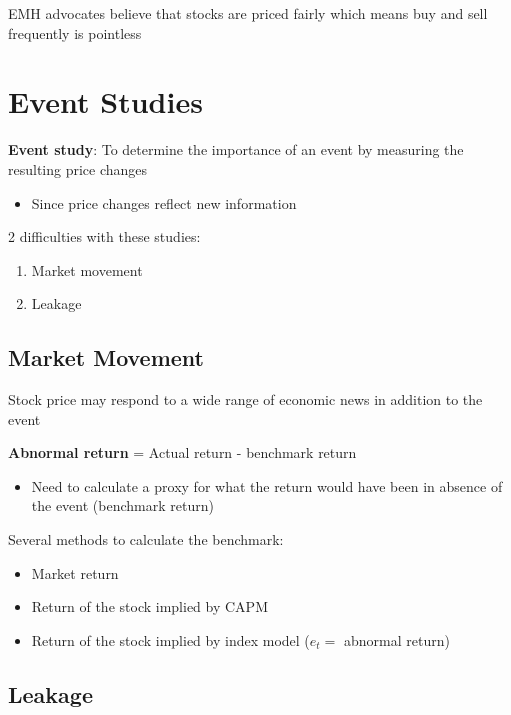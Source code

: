 \documentclass[]{book}
\providecommand{\tightlist}{%
  \setlength{\itemsep}{0pt}\setlength{\parskip}{0pt}}
\theoremstyle{definition}
\theoremstyle{definition}
\theoremstyle{remark}
\begin{document}
EMH advocates believe that stocks are priced fairly which means buy and
sell frequently is pointless

\section{Event Studies}\label{event-studies}

 \textbf{Event study}: To determine the importance of an event by
measuring the resulting price changes

\begin{itemize}
\tightlist
\item
  Since price changes reflect new information
\end{itemize}

2 difficulties with these studies:

\begin{enumerate}
\def\labelenumi{\arabic{enumi})}
\tightlist
\item
  Market movement
\item
  Leakage
\end{enumerate}

\subsection{Market Movement}\label{market-movement}

Stock price may respond to a wide range of economic news in addition to
the event

\textbf{Abnormal return} = Actual return - benchmark return

\begin{itemize}
\tightlist
\item
  Need to calculate a proxy for what the return would have been in
  absence of the event (benchmark return)
\end{itemize}

Several methods to calculate the benchmark:

\begin{itemize}
\tightlist
\item
  Market return
\item
  Return of the stock implied by CAPM
\item
  Return of the stock implied by index model (\(e_t =\) abnormal return)
\end{itemize}

\subsection{Leakage}\label{leakage}
\end{document}
